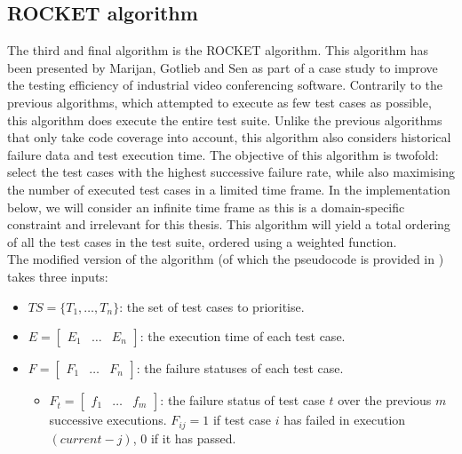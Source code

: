 
\subsection{ROCKET algorithm}
\label{ssec:alg-rocket}

The third and final algorithm is the ROCKET algorithm. This algorithm has been presented by Marijan, Gotlieb and Sen \cite{6676952} as part of a case study to improve the testing efficiency of industrial video conferencing software. Contrarily to the previous algorithms, which attempted to execute as few test cases as possible, this algorithm does execute the entire test suite. Unlike the previous algorithms that only take code coverage into account, this algorithm also considers historical failure data and test execution time. The objective of this algorithm is twofold: select the test cases with the highest successive failure rate, while also maximising the number of executed test cases in a limited time frame. In the implementation below, we will consider an infinite time frame as this is a domain-specific constraint and irrelevant for this thesis. This algorithm will yield a total ordering of all the test cases in the test suite, ordered using a weighted function.\\

\noindent The modified version of the algorithm (of which the pseudocode is provided in ) takes three inputs:
\begin{itemize}
	\item $TS = \{T_1, \dots, T_n\}$: the set of test cases to prioritise.
	\item $E = \begin{bmatrix}
		E_1 & \dots & E_n
	\end{bmatrix}$: the execution time of each test case.
	\item $F = \begin{bmatrix}
		F_1 & \dots & F_n
	\end{bmatrix}$: the failure statuses of each test case.
		\begin{itemize}
			\item $F_t = \begin{bmatrix}
				f_1 & \dots & f_m
			\end{bmatrix}$: the failure status of test case $t$ over the previous $m$ successive executions. $F_{ij} = 1$ if test case $i$ has failed in execution $(current - j)$, $0$ if it has passed.
		\end{itemize}
\end{itemize}

